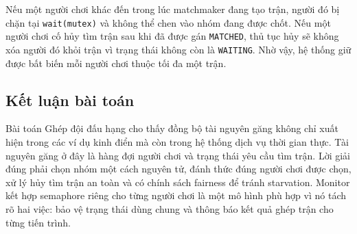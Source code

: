 Nếu một người chơi khác đến trong lúc matchmaker đang tạo trận, người đó bị
chặn tại \texttt{wait(mutex)} và không thể chen vào nhóm đang được chốt. Nếu
một người chơi cố hủy tìm trận sau khi đã được gán \texttt{MATCHED}, thủ tục
hủy sẽ không xóa người đó khỏi trận vì trạng thái không còn là
\texttt{WAITING}. Nhờ vậy, hệ thống giữ được bất biến mỗi người chơi thuộc tối
đa một trận.

\subsection{Kết luận bài toán}

Bài toán Ghép đội đấu hạng cho thấy đồng bộ tài nguyên găng không chỉ xuất hiện
trong các ví dụ kinh điển mà còn trong hệ thống dịch vụ thời gian thực. Tài
nguyên găng ở đây là hàng đợi người chơi và trạng thái yêu cầu tìm trận. Lời
giải đúng phải chọn nhóm một cách nguyên tử, đánh thức đúng người chơi được
chọn, xử lý hủy tìm trận an toàn và có chính sách fairness để tránh starvation.
Monitor kết hợp semaphore riêng cho từng người chơi là một mô hình phù hợp vì
nó tách rõ hai việc: bảo vệ trạng thái dùng chung và thông báo kết quả ghép
trận cho từng tiến trình.

